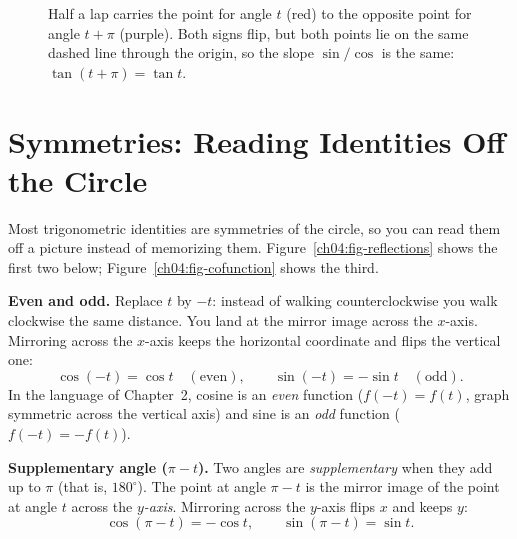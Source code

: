 \begin{figure}[htbp]
\centering
{}
\caption{Half a lap carries the point for angle $t$ (red) to the opposite point for angle $t+\pi$ (purple). Both signs flip, but both points lie on the same dashed line through the origin, so the slope $\sin/\cos$ is the same: $\tan(t+\pi) = \tan t$.}
\label{ch04:fig-tan-period}
\end{figure}

\section{Symmetries: Reading Identities Off the Circle}
\label{ch04:identities}

Most trigonometric identities are symmetries of the circle, so you can read them off a picture instead of memorizing them. Figure~\ref{ch04:fig-reflections} shows the first two below; Figure~\ref{ch04:fig-cofunction} shows the third.

\textbf{Even and odd.} Replace $t$ by $-t$: instead of walking counterclockwise you walk clockwise the same distance. You land at the mirror image across the $x$-axis. Mirroring across the $x$-axis keeps the horizontal coordinate and flips the vertical one:
\[
  \cos(-t) = \cos t \quad(\text{even}),\qquad
  \sin(-t) = -\sin t \quad(\text{odd}).
\]
In the language of Chapter~2, cosine is an \emph{even} function ($f(-t) = f(t)$, graph symmetric across the vertical axis) and sine is an \emph{odd} function ($f(-t) = -f(t)$).

\textbf{Supplementary angle ($\pi - t$).} Two angles are \emph{supplementary} when they add up to $\pi$ (that is, $180^\circ$). The point at angle $\pi - t$ is the mirror image of the point at angle $t$ across the \emph{$y$-axis}. Mirroring across the $y$-axis flips $x$ and keeps $y$:
\[
  \cos(\pi - t) = -\cos t,\qquad \sin(\pi - t) = \sin t.
\]

